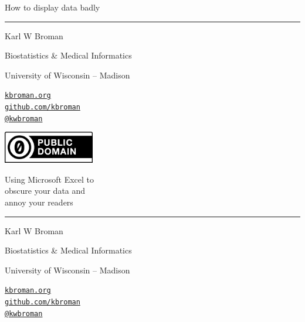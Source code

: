 \documentclass[12pt]{article}
\newcommand{\titlesize}{\fontsize{40}{50} \selectfont}
\newcommand{\headsize}{\fontsize{35}{35} \selectfont}
\newcommand{\textsize}{\fontsize{30}{35} \selectfont}
\newcommand{\smallersize}{\fontsize{20}{25} \selectfont}
\begin{document}
\thispagestyle{empty}

\begin{center}
\titlesize \color{myyellow}

\vspace*{19.5mm}

{\headsize How to display data badly}

\vspace*{19.5mm}

\color{mypink}
\rule{10in}{1mm}

\vspace{10mm}

\textsize \color{myblue}
Karl W Broman
\vspace{5mm}

{\smallersize Biostatistics \& Medical Informatics

University of Wisconsin -- Madison
\vspace{20mm}


\href{http://kbroman.org}{\tt kbroman.org} \\[5pt]
\href{https://github.com/kbroman}{\tt github.com/kbroman} \\[-5pt]
\href{https://twitter.com/kwbroman}{\tt @kwbroman}
}

\end{center}

\vfill \hfill
\href{http://creativecommons.org/publicdomain/zero/1.0/}{\includegraphics[height=14mm]{Figs/cc-zero.png}}

\newpage

\thispagestyle{empty}

\begin{center}
\titlesize \color{myyellow}

\vspace*{10mm}

{\headsize Using Microsoft Excel to \\[12pt]
obscure your data and \\[2pt]
annoy your readers}


\color{mypink}
\rule{10in}{1mm}

\vspace{10mm}

\textsize \color{myblue}
Karl W Broman
\vspace{5mm}

{\smallersize Biostatistics \& Medical Informatics

University of Wisconsin -- Madison
\vspace{20mm}


\href{http://kbroman.org}{\tt kbroman.org} \\[5pt]
\href{https://github.com/kbroman}{\tt github.com/kbroman} \\[-5pt]
\href{https://twitter.com/kwbroman}{\tt @kwbroman}
}

\end{center}
\end{document}
